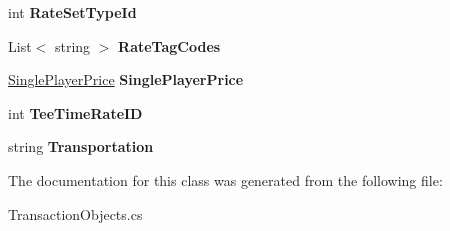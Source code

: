 \begin{DoxyCompactItemize}
int {\bfseries Rate\+Set\+Type\+Id}
\item 
\mbox{\label{class_golf_now_a_p_i_handler_1_1_display_rate_a61caeae1c4455aa41283d8c5fafa22d7}} 
List$<$ string $>$ {\bfseries Rate\+Tag\+Codes}
\item 
\mbox{\label{class_golf_now_a_p_i_handler_1_1_display_rate_a26a18f198cd836c52fddd3c019a65fc4}} 
\mbox{\hyperlink{class_golf_now_a_p_i_handler_1_1_single_player_price}{Single\+Player\+Price}} {\bfseries Single\+Player\+Price}
\item 
\mbox{\label{class_golf_now_a_p_i_handler_1_1_display_rate_affa0bc3f6eb664fb651745f5a093e029}} 
int {\bfseries Tee\+Time\+Rate\+ID}
\item 
\mbox{\label{class_golf_now_a_p_i_handler_1_1_display_rate_ae2ba9ce5711c3a21116f056af8723f8b}} 
string {\bfseries Transportation}
\end{DoxyCompactItemize}


The documentation for this class was generated from the following file\+:\begin{DoxyCompactItemize}
\item 
Transaction\+Objects.\+cs\end{DoxyCompactItemize}
